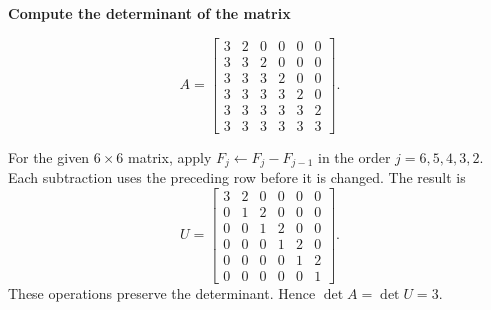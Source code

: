 \providecommand{\rank}{\operatorname{r}}
\providecommand{\RR}{\mathbb R}
\providecommand{\CC}{\mathbb C}
\providecommand{\KK}{\mathbb K}

\setcounter{enumi}{44}
\item {\bfseries\boldmath
Compute the determinant of the matrix
}

\[
A=\begin{bmatrix}3&2&0&0&0&0\\3&3&2&0&0&0\\3&3&3&2&0&0\\3&3&3&3&2&0\\3&3&3&3&3&2\\3&3&3&3&3&3\end{bmatrix}.
\]

\begin{answer}
For the given $6\times6$ matrix, apply
$F_j\gets F_j-F_{j-1}$ in the order $j=6,5,4,3,2$.
Each subtraction uses the preceding row before it is changed. The result is
\[
 U=\begin{bmatrix}
 3&2&0&0&0&0\\0&1&2&0&0&0\\0&0&1&2&0&0\\
 0&0&0&1&2&0\\0&0&0&0&1&2\\0&0&0&0&0&1
 \end{bmatrix}.
\]
These operations preserve the determinant. Hence $\det A=\det U=3$.
\end{answer}
